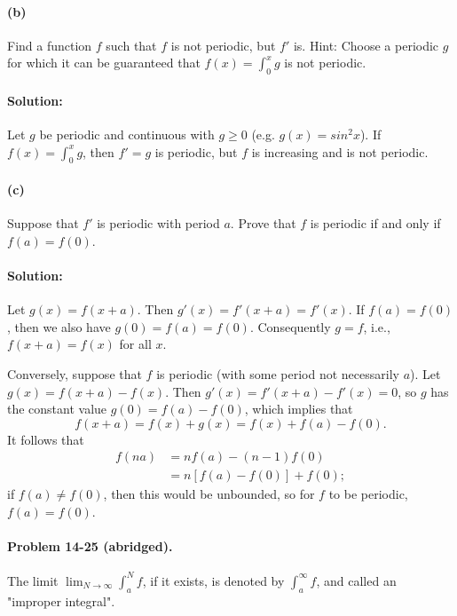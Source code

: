 \documentclass{article}
\begin{document}
\paragraph{(b)} Find a function $f$ such that $f$ is not periodic, but $f'$ is.
Hint: Choose a periodic $g$ for which it can be guaranteed that $f(x) =
\int_0^x g$ is not periodic.

\paragraph{Solution:} Let $g$ be periodic and continuous with $g \geq 0$ (e.g.
$g(x) = sin^2 x$). If $f(x) = \int_0^x g$, then $f' = g$ is periodic, but $f$
is increasing and is not periodic.

\paragraph{(c)} Suppose that $f'$ is periodic with period $a$. Prove that $f$
is periodic if and only if $f(a) = f(0)$.

\paragraph{Solution:} Let $g(x) = f(x + a)$. Then $g'(x) = f'(x + a) = f'(x)$.
If $f(a) = f(0)$, then we also have $g(0) = f(a) = f(0)$. Consequently $g = f$,
i.e., $f(x + a) = f(x)$ for all $x$.

Conversely, suppose that $f$ is periodic (with some period not necessarily
$a$). Let $g(x) = f(x + a) - f(x)$. Then $g'(x) = f'(x + a) - f'(x) = 0$, so
$g$ has the constant value $g(0) = f(a) - f(0)$, which implies that
\begin{equation*}
  f(x + a) = f(x) + g(x) = f(x) + f(a) - f(0).
\end{equation*} It follows that \begin{align*}
  f(na) &= nf(a) - (n - 1)f(0) \\
        &= n[f(a) - f(0)] + f(0);
\end{align*} if $f(a) \neq f(0)$, then this would be unbounded, so for $f$ to
be periodic, $f(a) = f(0)$.

\paragraph{Problem 14-25 (abridged).} The limit $\lim_{N \rightarrow \infty}
\int_a^N f$, if it exists, is denoted by $\int_a^{\infty} f$, and called an
"improper integral".
\end{document}
